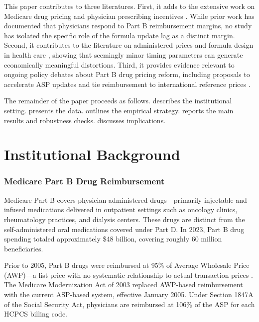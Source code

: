 \documentclass[12pt]{article}
\begin{document}
This paper contributes to three literatures. First, it adds to the extensive work on Medicare drug pricing and physician prescribing incentives \citep{jacobson2006, duggan2010, dafny2017}. While prior work has documented that physicians respond to Part B reimbursement margins, no study has isolated the specific role of the formula update lag as a distinct margin. Second, it contributes to the literature on administered prices and formula design in health care \citep{cutler2010, clemens2014, einav2018}, showing that seemingly minor timing parameters can generate economically meaningful distortions. Third, it provides evidence relevant to ongoing policy debates about Part B drug pricing reform, including proposals to accelerate ASP updates and tie reimbursement to international reference prices \citep{cbo2021, medpac2023}.

The remainder of the paper proceeds as follows.  describes the institutional setting.  presents the data.  outlines the empirical strategy.  reports the main results and robustness checks.  discusses implications.


\section{Institutional Background}\label{sec:background}

\subsubsection*{Medicare Part B Drug Reimbursement} Medicare Part B covers physician-administered drugs---primarily injectable and infused medications delivered in outpatient settings such as oncology clinics, rheumatology practices, and dialysis centers. These drugs are distinct from the self-administered oral medications covered under Part D. In 2023, Part B drug spending totaled approximately \$48 billion, covering roughly 60 million beneficiaries.

Prior to 2005, Part B drugs were reimbursed at 95\% of Average Wholesale Price (AWP)---a list price with no systematic relationship to actual transaction prices \citep{cbo2021}. The Medicare Modernization Act of 2003 replaced AWP-based reimbursement with the current ASP-based system, effective January 2005. Under Section 1847A of the Social Security Act, physicians are reimbursed at 106\% of the ASP for each HCPCS billing code.
\end{document}

